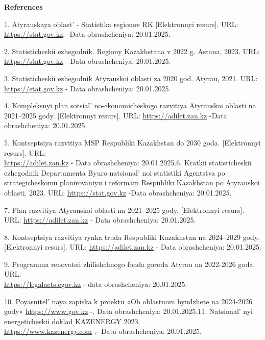 \begin{center}
{\bfseries References}
\end{center}

\begin{references}
1. Atyrauskaya oblast'{} - Statistika regionov RK
{[}Elektronnyi resurs{]}. URL: \href{https://stat.gov.kz/ru/region/atyrau}{https://stat.gov.kz}.
-Data obrash\-cheniya: 20.01.2025.

2. Statisticheskii ezhegodnik. Regiony Kazakhstana v 2022 g. Astana,
2023. URL:
\href{https://stat.gov.kz/ru/publication/collections/?year=2022&name=17195&period=year}{https://stat.gov.kz}
- Data obrashcheniya: 20.01.2025.

3. Statisticheskii ezhegodnik Atyrauskoi oblasti za 2020 god. Atyrau,
2021. URL:
\href{https://stat.gov.kz/ru/region/atyrau/collections/?year=2020&period=year&name=120885}{https://stat.gov.kz}
- Data obrashcheniya: 20.01.2025.

4. Kompleksnyi plan sotsial' no-ekonomicheskogo razvitiya
Atyrauskoi oblasti na 2021--2025 gody. {[}Elek\-tronnyi resurs{]}. URL:
\href{https://adilet.zan.kz/rus/docs/P2100000337}{https://adilet.zan.kz}
-Data obrashcheniya: 20.01.2025.

5. Kontseptsiya razvitiya MSP Respubliki Kazakhstan do 2030 goda.
{[}Elektronnyi resurs{]}. URL:\\
\href{https://adilet.zan.kz/rus/docs/P2300001050/history}{https://adilet.zan.kz} - Data obrashcheniya:
20.01.2025.6. Kratkii statisticheskii ezhegodnik Departamenta Byuro
natsional' noi statistiki Agentstva po strategicheskomu
planirovaniyu i reformam Respubliki Kazakh\-stan po Atyrauskoi oblasti.
2023. URL:
\href{https://stat.gov.kz/ru/region/atyrau/collections/?year=2022&period=year&name=52710}{https://stat.gov.kz}
-Data obrashcheniya: 20.01.2025.

7. Plan razvitiya Atyrauskoi oblasti na 2021--2025 gody. {[}Elektronnyi
resurs{]}. URL: \href{https://adilet.zan.kz/rus/docs/P2100000337}{https://adilet.zan.kz} - Data
obrashcheniya: 20.01.2025.

8. Kontseptsiya razvitiya rynka truda Respubliki Kazakhstan na
2024--2029 gody. {[}Elektronnyi resurs{]}. URL:
\href{https://adilet.zan.kz/rus/docs/P2300001050/history}{https://adilet.zan.kz}
- Data obrashcheniya: 20.01.2025.

9. Programma renovatsii zhilishchnogo fonda goroda Atyrau na 2022-2026
goda. URL:\\
\href{https://legalacts.egov.kz/npa/view?id=14132167}{https://legalacts.egov.kz}
- data obrashcheniya: 20.01.2025.

10. Poyasnitel' naya zapiska k proektu «Ob oblastnom
byudzhete na 2024-2026 gody»
\href{https://www.gov.kz/memleket/entities/atyrau-economy/documents/details/597525?lang=ru}{https://www.gov.kz}
-. Data obrashcheniya:
20.01.2025.11. Natsional' nyi energeticheskii doklad KAZENERGY 2023.\\
\href{https://www.kazenergy.com/ru/operation/ned/2117/}{https://www.kazenergy.com}
.- Data obrashcheniya: 20.01.2025.
\end{references}

